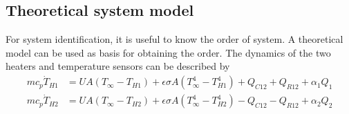 \subsection{Theoretical system model}\label{TSM}
For system identification, it is useful to know the order of system. A theoretical model can be used as basis for obtaining the order. The dynamics of the two heaters and temperature sensors can be described by \cite{APMonitor}
\begin{align}
    mc_p\dot{T}_{H1} &= U A (T_{\infty} - T_{H1}) + \epsilon\sigma A(T^4_{\infty} - T^4_{H1}) + Q_{C12} + Q_{R12} +\alpha_1 Q_1 \label{eq:nonlin1} \\
    mc_p\dot{T}_{H2} &= U A (T_{\infty} - T_{H2}) + \epsilon\sigma A(T^4_{\infty} - T^4_{H2}) - Q_{C12} - Q_{R12} +\alpha_2 Q_2 \label{eq:nonlin2}
\end{align}

